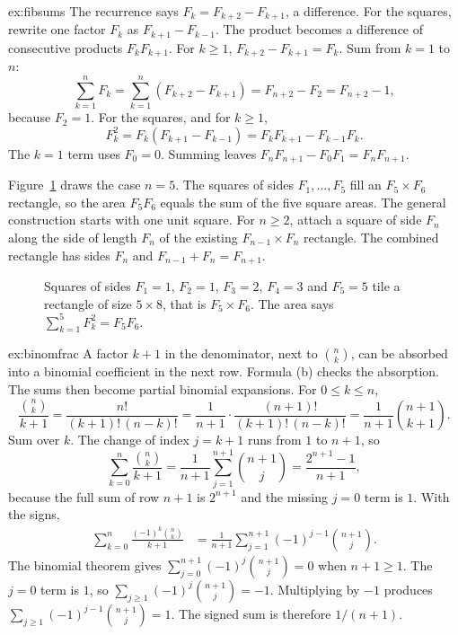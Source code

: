 \begin{solution}{ex:fibsums}
\idea The recurrence says $F_k=F_{k+2}-F_{k+1}$, a difference. For the squares, rewrite one factor $F_k$ as $F_{k+1}-F_{k-1}$. The product becomes a difference of consecutive products $F_k F_{k+1}$.
\writeup For $k\ge1$, $F_{k+2}-F_{k+1}=F_k$. Sum from $k=1$ to $n$:
\[
\sum_{k=1}^n F_k=\sum_{k=1}^n(F_{k+2}-F_{k+1})=F_{n+2}-F_2=F_{n+2}-1,
\]
because $F_2=1$. For the squares, and for $k\ge1$,
\[
F_k^2=F_k(F_{k+1}-F_{k-1})=F_k F_{k+1}-F_{k-1}F_k.
\]
The $k=1$ term uses $F_0=0$. Summing leaves $F_n F_{n+1}-F_0 F_1=F_n F_{n+1}$.

Figure~\ref{fig:fibrect} draws the case $n=5$. The squares of sides $F_1,\dots,F_5$ fill an $F_5\times F_6$ rectangle, so the area $F_5 F_6$ equals the sum of the five square areas. The general construction starts with one unit square. For $n\ge2$, attach a square of side $F_n$ along the side of length $F_n$ of the existing $F_{n-1}\times F_n$ rectangle. The combined rectangle has sides $F_n$ and $F_{n-1}+F_n=F_{n+1}$.
\end{solution}

\begin{figure}[ht]
\centering
{}
\caption{Squares of sides $F_1=1$, $F_2=1$, $F_3=2$, $F_4=3$ and $F_5=5$ tile a rectangle of size $5\times8$, that is $F_5\times F_6$. The area says $\sum_{k=1}^5 F_k^2=F_5 F_6$.}
\label{fig:fibrect}
\end{figure}

\begin{solution}{ex:binomfrac}
\idea A factor $k+1$ in the denominator, next to $\binom nk$, can be absorbed into a binomial coefficient in the next row. Formula (b) checks the absorption. The sums then become partial binomial expansions.
\writeup For $0\le k\le n$,
\[
\frac{\binom nk}{k+1}=\frac{n!}{(k+1)!\,(n-k)!}=\frac{1}{n+1}\cdot\frac{(n+1)!}{(k+1)!\,(n-k)!}=\frac{1}{n+1}\binom{n+1}{k+1}.
\]
Sum over $k$. The change of index $j=k+1$ runs from $1$ to $n+1$, so
\[
\sum_{k=0}^n\frac{\binom nk}{k+1}=\frac1{n+1}\sum_{j=1}^{n+1}\binom{n+1}{j}=\frac{2^{n+1}-1}{n+1},
\]
because the full sum of row $n+1$ is $2^{n+1}$ and the missing $j=0$ term is $1$. With the signs,
\begin{align*}
\sum_{k=0}^n\frac{(-1)^k\binom nk}{k+1}
&=\frac1{n+1}\sum_{j=1}^{n+1}(-1)^{j-1}\binom{n+1}{j}.
\end{align*}
The binomial theorem gives $\sum_{j=0}^{n+1}(-1)^j\binom{n+1}{j}=0$ when $n+1\ge1$. The $j=0$ term is $1$, so $\sum_{j\ge1}(-1)^j\binom{n+1}{j}=-1$. Multiplying by $-1$ produces $\sum_{j\ge1}(-1)^{j-1}\binom{n+1}{j}=1$. The signed sum is therefore $1/(n+1)$.
\end{solution}

